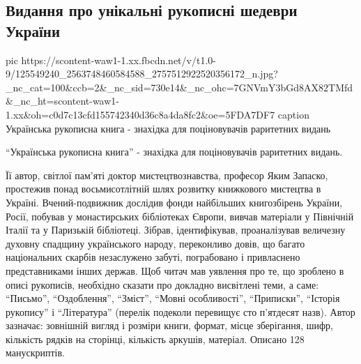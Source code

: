  
 
 

\subsection{Видання про унікальні рукописні шедеври України}
\label{sec:16_11_2020.fb.ihor_melnyk.1.rukopysy}


\ifcmt
pic https://scontent-waw1-1.xx.fbcdn.net/v/t1.0-9/125549240_2563748460584588_2757512922520356172_n.jpg?_nc_cat=100&ccb=2&_nc_sid=730e14&_nc_ohc=7GNVmY3bGd8AX82TMfd&_nc_ht=scontent-waw1-1.xx&oh=c0d7c13cfd155742340d36c8a4da8fc2&oe=5FDA7DF7
caption Українська рукописна книга - знахідка для поціновувачів раритетних видань
\fi

\enquote{Українська рукописна книга} - знахідка для поціновувачів раритетних
видань.

Її автор, світлої пам’яті доктор мистецтвознавства, професор Яким Запаско,
простежив понад восьмисотлітній шлях розвитку книжкового мистецтва в Україні.
Вчений-подвижник дослідив фонди найбільших книгозбірень України, Росії, побував
у монастирських бібліотеках Європи, вивчав матеріали у Північній Італії та у
Паризькій бібліотеці. Зібрав, ідентифікував, проаналізував величезну духовну
спадщину українського народу, переконливо довів, що багато національних скарбів
незаслужено забуті, пограбовано і привласнено представниками інших держав. Щоб
читач мав уявлення про те, що зроблено в описі рукописів, необхідно сказати про
докладно висвітлені теми, а саме: “Письмо”, “Оздоблення”, “Зміст”, “Мовні
особливості”, “Приписки”, “Історія рукопису” і “Література” (перелік подеколи
перевищує сто п’ятдесят назв). Автор зазначає: зовнішній вигляд і розміри
книги, формат, місце зберігання, шифр, кількість рядків на сторінці, кількість
аркушів, матеріал. Описано 128 манускриптів.

